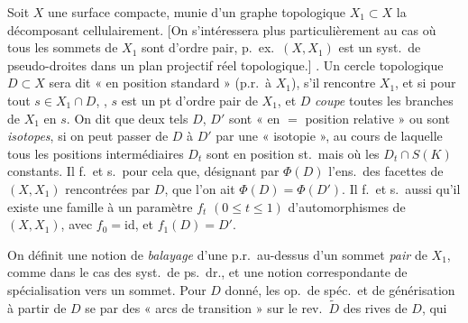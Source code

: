 \documentclass[11pt,a4paper]{article}
\begin{document}
Soit $X$ une surface compacte, munie d'un graphe topologique $X_1 \subset X$ la décomposant cellulairement. [On s'intéressera plus particulièrement au cas où tous les \struck{\ill{}} sommets de $X_1$ sont d'ordre pair, p.\ ex.\ $(X, X_1)$ est un syst.\ de pseudo-droites dans un plan \struck{\ill{}} projectif réel topologique.]
. Un cercle topologique $D \subset X$ sera dit « en position standard » (p.r.\ à $X_1$), s'il  rencontre $X_1$, et si pour tout $s \in X_1 \cap D$, , $s$ est un pt d'ordre pair de $X_1$, et $D$ \emph{coupe} toutes les branches de $X_1$ en $s$. On dit que deux tels $D$, $D'$ sont « en $=$ position relative » ou sont \emph{isotopes}, si on peut passer de $D$ à $D'$ par une « isotopie », au cours de laquelle tous les positions intermédiaires $D_t$ sont en position st.\ mais où les $D_t \cap S(K)$  constants.
Il f.\ et s.\ pour cela que,  désignant par $\Phi(D)$ l'ens.\ des facettes de $(X, X_1)$ rencontrées par $D$, que l'on ait $\Phi(D) = \Phi(D')$. Il f.\ et s.\ aussi qu'il existe une famille à un paramètre $f_t$ $(0 \leqslant t \leqslant 1)$ d'automorphismes de $(X, X_1)$, avec $f_0 = \mathrm{id}$, et $f_1(D) = D'$.

On définit une notion de \emph{balayage} d'une p.r.\ au-dessus d'un sommet \emph{pair} de $X_1$, comme dans le cas des syst.\ de ps.\ dr., et une notion correspondante de spécialisation vers un sommet. 
Pour $D$ donné, les op.\ de spéc.\ et de générisation à partir de $D$ se  \ill{} par des « arcs de  transition » sur  le rev.\ $\widetilde{D}$ des rives de $D$, qui

\end{document}
